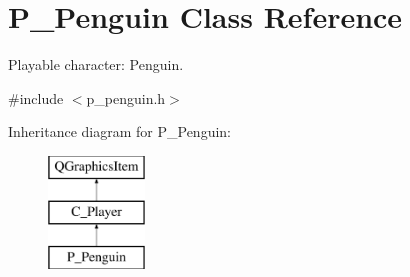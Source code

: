 \hypertarget{class_p___penguin}{}\section{P\+\_\+\+Penguin Class Reference}
\label{class_p___penguin}


Playable character\+: Penguin.  




{\ttfamily \#include $<$p\+\_\+penguin.\+h$>$}

Inheritance diagram for P\+\_\+\+Penguin\+:\begin{figure}[H]
\begin{center}
\leavevmode
\includegraphics[height=3.000000cm]{class_p___penguin}
\end{center}
\end{figure}

